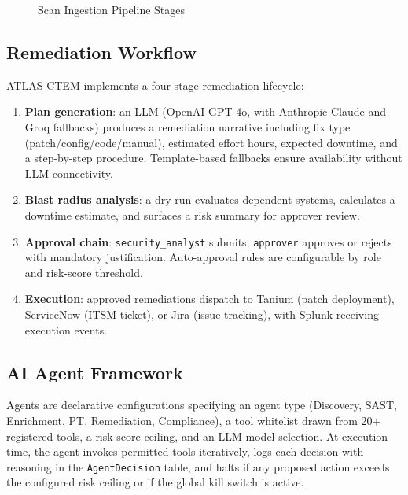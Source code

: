 \documentclass[conference]{IEEEtran}
\begin{document}
\begin{figure}[t]
  \centering
  \caption{Scan Ingestion Pipeline Stages}
  \label{fig:pipeline}
\end{figure}

\subsection{Remediation Workflow}

ATLAS-CTEM implements a four-stage remediation lifecycle:

\begin{enumerate}
  \item \textbf{Plan generation}: an LLM (OpenAI GPT-4o, with Anthropic Claude and Groq fallbacks) produces a remediation narrative including fix type (patch/config/code/manual), estimated effort hours, expected downtime, and a step-by-step procedure. Template-based fallbacks ensure availability without LLM connectivity.
  \item \textbf{Blast radius analysis}: a dry-run evaluates dependent systems, calculates a downtime estimate, and surfaces a risk summary for approver review.
  \item \textbf{Approval chain}: \texttt{security\_analyst} submits; \texttt{approver} approves or rejects with mandatory justification. Auto-approval rules are configurable by role and risk-score threshold.
  \item \textbf{Execution}: approved remediations dispatch to Tanium (patch deployment), ServiceNow (ITSM ticket), or Jira (issue tracking), with Splunk receiving execution events.
\end{enumerate}

\subsection{AI Agent Framework}

Agents are declarative configurations specifying an agent type (Discovery, SAST, Enrichment, PT, Remediation, Compliance), a tool whitelist drawn from 20+ registered tools, a risk-score ceiling, and an LLM model selection. At execution time, the agent invokes permitted tools iteratively, logs each decision with reasoning in the \texttt{AgentDecision} table, and halts if any proposed action exceeds the configured risk ceiling or if the global kill switch is active.
\end{document}
